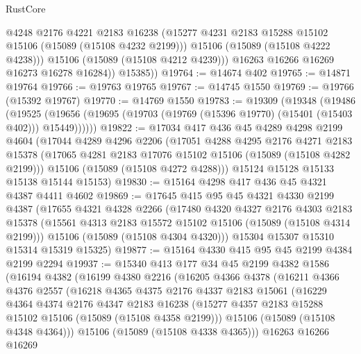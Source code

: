 \begin{lexlean}{RustCore}
\begin{coremodule}
                @4248
                @2176
                @4221
                @2183
                @16238
                (@15277 @4231 @2183 @15288 @15102 @15106 (@15089 (@15108 @4232 @2199)))
                @15106
                (@15089 (@15108 @4222 @4238)))
              @15106
              (@15089 (@15108 @4212 @4239)))
            @16263
            @16266
            @16269
            @16273
            @16278
            @16284))
        @15385))
@19764 := @14674 @402
@19765 := @14871 @19764
@19766 := @19763 @19765
@19767 := @14745 @1550
@19769 := @19766 (@15392 @19767)
@19770 := @14769 @1550
@19783 := @19309
    (@19348
      (@19486
        (@19525 (@19656 (@19695 (@19703 (@19769 (@15396 @19770) (@15401 (@15403 @402))) @15449))))))
@19822 := @17034
    @417
    @436
    @45
    @4289
    @4298
    @2199
    @4604
    (@17044
      @4289
      @4296
      @2206
      (@17051
        @4288
        @4295
        @2176
        @4271
        @2183
        @15378
        (@17065 @4281 @2183 @17076 @15102 @15106 (@15089 (@15108 @4282 @2199)))
        @15106
        (@15089 (@15108 @4272 @4288)))
      @15124
      @15128
      @15133
      @15138
      @15144
      @15153)
@19830 := @15164 @4298 @417 @436 @45 @4321 @4387 @4411 @4602
@19869 := @17645
    @415
    @95
    @45
    @4321
    @4330
    @2199
    @4387
    (@17655
      @4321
      @4328
      @2266
      (@17480
        @4320
        @4327
        @2176
        @4303
        @2183
        @15378
        (@15561 @4313 @2183 @15572 @15102 @15106 (@15089 (@15108 @4314 @2199)))
        @15106
        (@15089 (@15108 @4304 @4320)))
      @15304
      @15307
      @15310
      @15314
      @15319
      @15325)
@19877 := @15164 @4330 @415 @95 @45 @2199 @4384 @2199 @2294
@19937 := @15340
    @413
    @177
    @34
    @45
    @2199
    @4382
    @1586
    (@16194
      @4382
      (@16199
        @4380
        @2216
        (@16205
          @4366
          @4378
          (@16211
            @4366
            @4376
            @2557
            (@16218
              @4365
              @4375
              @2176
              @4337
              @2183
              @15061
              (@16229
                @4364
                @4374
                @2176
                @4347
                @2183
                @16238
                (@15277 @4357 @2183 @15288 @15102 @15106 (@15089 (@15108 @4358 @2199)))
                @15106
                (@15089 (@15108 @4348 @4364)))
              @15106
              (@15089 (@15108 @4338 @4365)))
            @16263
            @16266
            @16269

\end{coremodule}
\end{lexlean}
